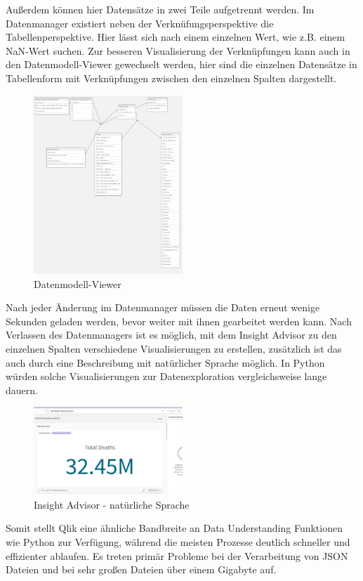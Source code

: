 \documentclass[12pt]{article}
\begin{document}
	Außerdem können hier Datensätze in zwei Teile aufgetrennt werden.
	Im Datenmanager existiert neben der Verknüfungsperspektive die Tabellenperspektive. Hier lässt sich nach einem einzelnen Wert, wie z.B. einem NaN-Wert suchen.
	Zur besseren Visualisierung der Verknüpfungen kann auch in den Datenmodell-Viewer gewechselt werden, hier sind die einzelnen Datensätze in Tabellenform mit Verknüpfungen zwischen den einzelnen Spalten dargestellt.
	\begin{figure}[h]
		\centering
		\includegraphics[width=0.5\textwidth]{table_viewer}
		\caption{Datenmodell-Viewer}
	\end{figure}
	Nach jeder Änderung im Datenmanager müssen die Daten erneut wenige Sekunden geladen werden, bevor weiter mit ihnen gearbeitet werden kann.
	Nach Verlassen des Datenmanagers ist es möglich, mit dem Insight Advisor zu den einzelnen Spalten verschiedene Visualisierungen zu erstellen, zusätzlich ist das auch durch eine Beschreibung mit natürlicher Sprache möglich. In Python würden solche Visualisierungen zur Datenexploration vergleichsweise lange dauern.
	\begin{figure}[h]
		\centering
		\includegraphics[width=0.5\textwidth]{bsp_ask}
		\caption{Insight Advisor - natürliche Sprache}
	\end{figure}
	
	Somit stellt Qlik eine ähnliche Bandbreite an Data Understanding Funktionen wie Python zur Verfügung, während die meisten Prozesse deutlich schneller und effizienter ablaufen. Es treten primär Probleme bei der Verarbeitung von JSON Dateien und bei sehr großen Dateien über einem Gigabyte auf.
	
\end{document}
